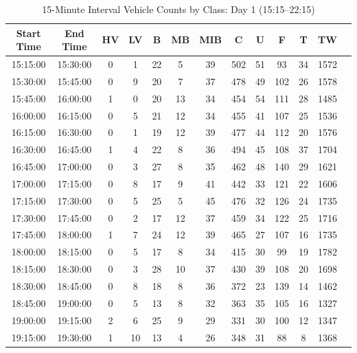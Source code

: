 \begin{table}[h!]
    \centering
    \small
    \caption{15-Minute Interval Vehicle Counts by Class: Day 1 (15:15--22:15)}
    \label{tab:time_data_part2}
    \begin{tabular}{ccccccccccccc}
        \toprule
        \textbf{Start Time} & \textbf{End Time} & \textbf{HV} & \textbf{LV} & \textbf{B} & \textbf{MB} & \textbf{MIB} & \textbf{C} & \textbf{U} & \textbf{F} & \textbf{T} & \textbf{TW} \\
        \midrule
        15:15:00 & 15:30:00 & 0 & 1 & 22 & 5 & 39 & 502 & 51 & 93 & 34 & 1572 \\
        15:30:00 & 15:45:00 & 0 & 9 & 20 & 7 & 37 & 478 & 49 & 102 & 26 & 1578 \\
        15:45:00 & 16:00:00 & 1 & 0 & 20 & 13 & 34 & 454 & 54 & 111 & 28 & 1485 \\
        16:00:00 & 16:15:00 & 0 & 5 & 21 & 12 & 34 & 455 & 41 & 107 & 25 & 1536 \\
        16:15:00 & 16:30:00 & 0 & 1 & 19 & 12 & 39 & 477 & 44 & 112 & 20 & 1576 \\
        16:30:00 & 16:45:00 & 1 & 4 & 22 & 8 & 36 & 494 & 45 & 108 & 37 & 1704 \\
        16:45:00 & 17:00:00 & 0 & 3 & 27 & 8 & 35 & 462 & 48 & 140 & 29 & 1621 \\
        17:00:00 & 17:15:00 & 0 & 8 & 17 & 9 & 41 & 442 & 33 & 121 & 22 & 1606 \\
        17:15:00 & 17:30:00 & 0 & 5 & 25 & 5 & 45 & 476 & 32 & 126 & 24 & 1735 \\
        17:30:00 & 17:45:00 & 0 & 2 & 17 & 12 & 37 & 459 & 34 & 122 & 25 & 1716 \\
        17:45:00 & 18:00:00 & 1 & 7 & 24 & 12 & 39 & 465 & 27 & 107 & 16 & 1735 \\
        18:00:00 & 18:15:00 & 0 & 5 & 17 & 8 & 34 & 415 & 30 & 99 & 19 & 1782 \\
        18:15:00 & 18:30:00 & 0 & 3 & 28 & 10 & 37 & 430 & 39 & 108 & 20 & 1698 \\
        18:30:00 & 18:45:00 & 0 & 8 & 18 & 8 & 36 & 372 & 23 & 139 & 14 & 1462 \\
        18:45:00 & 19:00:00 & 0 & 5 & 13 & 8 & 32 & 363 & 35 & 105 & 16 & 1327 \\
        19:00:00 & 19:15:00 & 2 & 6 & 25 & 9 & 29 & 331 & 30 & 100 & 12 & 1347 \\
        19:15:00 & 19:30:00 & 1 & 10 & 13 & 4 & 26 & 348 & 31 & 88 & 8 & 1368 \\

\end{tabular}
\end{table}
